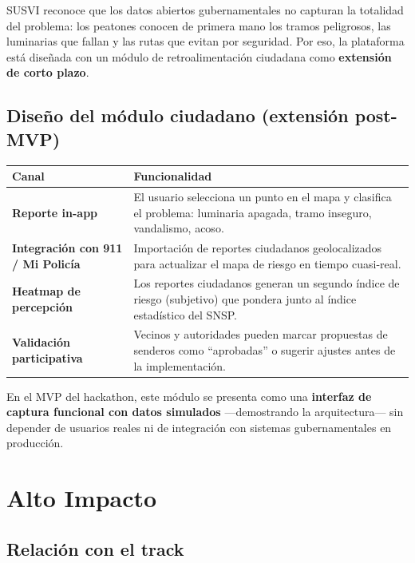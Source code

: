 \documentclass[12pt,a4paper]{article}
\begin{document}
SUSVI reconoce que los datos abiertos gubernamentales no capturan la totalidad del problema: los peatones conocen de primera mano los tramos peligrosos, las luminarias que fallan y las rutas que evitan por seguridad. Por eso, la plataforma está diseñada con un módulo de retroalimentación ciudadana como \textbf{extensión de corto plazo}.

\subsection{Diseño del módulo ciudadano (extensión post-MVP)}

\begin{table}[H]
\centering
\small
\renewcommand{\arraystretch}{1.3}
\begin{tabularx}{\textwidth}{>{\bfseries}l X}
\toprule
\rowcolor{azuloscuro}
\color{white}\textbf{Canal} & \color{white}\textbf{Funcionalidad} \\
\midrule
Reporte in-app & El usuario selecciona un punto en el mapa y clasifica el problema: luminaria apagada, tramo inseguro, vandalismo, acoso. \\
\rowcolor{fondoazul}
Integración con 911 / Mi Policía & Importación de reportes ciudadanos geolocalizados para actualizar el mapa de riesgo en tiempo cuasi-real. \\
Heatmap de percepción & Los reportes ciudadanos generan un segundo índice de riesgo (subjetivo) que pondera junto al índice estadístico del SNSP. \\
\rowcolor{fondoazul}
Validación participativa & Vecinos y autoridades pueden marcar propuestas de senderos como ``aprobadas'' o sugerir ajustes antes de la implementación. \\
\bottomrule
\end{tabularx}
\end{table}

En el MVP del hackathon, este módulo se presenta como una \textbf{interfaz de captura funcional con datos simulados} —demostrando la arquitectura— sin depender de usuarios reales ni de integración con sistemas gubernamentales en producción.


\newpage
\section{Alto Impacto}

\subsection{Relación con el track}
\end{document}
